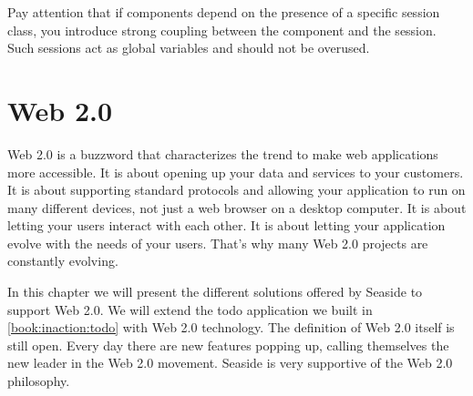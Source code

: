 \documentclass[a4paper,10pt,twoside]{book}
\begin{document}
Pay attention that if components depend on the presence of a specific session class, you introduce strong coupling between the component and the session. Such sessions act as global variables and should not be overused.

\part{Web 2.0}
\label{book:web20}

Web 2.0 is a buzzword that characterizes the trend to make web applications more accessible. It is about opening up your data and services to your customers. It is about supporting standard protocols and allowing your application to run on many different devices, not just a web browser on a desktop computer. It is about letting your users interact with each other. It is about letting your application evolve with the needs of your users. That's why many Web 2.0 projects are constantly evolving.

In this chapter we will present the different solutions offered by Seaside to support Web 2.0. We will extend the todo application we built in \autoref{book:inaction:todo} with Web 2.0 technology. The definition of Web 2.0 itself is still open. Every day there are new features popping up, calling themselves the new leader in the Web 2.0 movement. Seaside is very supportive of the Web 2.0 philosophy.
\end{document}
